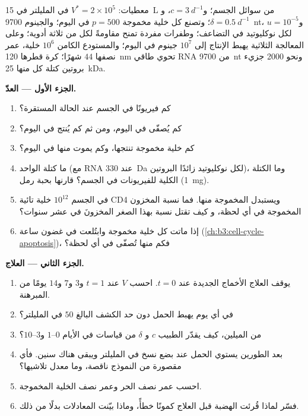 \begin{problem}
\label{pb:b3:virology:1}
معطيات:  $V^{*} = 2\times 10^{5}$ في المليلتر في \qty{15}{L} من سوائل
الجسم؛ و$c = \qty{3}{d^{-1}}$، و$\delta = \qty{0.5}{d^{-1}}$؛ وتصنع كل خلية
مخموجة $p = 500$  في اليوم؛ والجينوم \qty{9700}{nt}، و$u = 10^{-5}$
لكل نوكليوتيد في التضاعف؛ وطفرات مفردة تمنح مقاومةً
لكل من ثلاثة أدوية؛ وعلى المعالجة الثلاثية يهبط الإنتاج إلى $10^{7}$
جينوم في اليوم؛ والمستودع الكامن $10^{6}$ خلية، عمر نصفها $44$ شهرًا؛
 كرة قطرها \qty{120}{nm} تحوي طاقي RNA من \qty{9700}{nt}
ونحو \num{2000} جزيء بروتين كتلة كل منها \qty{25}{kDa}.

\medskip
\noindent\textbf{الجزء الأول --- العدّ.}
\begin{enumerate}
  \item كم فيريونًا في الجسم عند الحالة المستقرة؟
  \item كم يُصفّى في اليوم، ومن ثم كم يُنتج في اليوم؟
  \item كم خلية مخموجة تنتجها، وكم يموت منها في
        اليوم؟
  \item ما كتلة  الواحد (مع RNA عند \qty{330}{Da} لكل
        نوكليوتيد زائدًا البروتين)، وما الكتلة الكلية للفيريونات في
        الجسم؟ قارنها بحبة رمل (\qty{1}{mg}).
  \item في الجسم $10^{12}$ خلية تائية CD4 ويستبدل المخموجة
        منها. فما نسبة المخزون المخموجة في أي لحظة، و
        كيف تقتل نسبة بهذا الصغر المخزونَ في عشر سنوات؟
  \item إذا ماتت كل خلية مخموجة  وابتُلعت في غضون
        ساعة (\cref{ch:b3:cell-cycle-apoptosis})، فكم منها تُصفّى
        في أي لحظة؟
\end{enumerate}

\medskip
\noindent\textbf{الجزء الثاني --- العلاج.}
\begin{enumerate}[resume]
  \item يوقف العلاج الأخماج الجديدة عند $t = 0$. احسب $V$ عند $t =
        1$ و$3$ و$7$ و$14$ يومًا من المبرهنة.
  \item في أي يوم يهبط الحمل دون حد الكشف البالغ
        $50$ في المليلتر؟
  \item من الميلين، كيف يقدّر الطبيب $c$ و
        $\delta$ من قياسات في الأيام $0$--$1$ و$3$--$10$؟
  \item بعد الطورين يستوي الحمل عند بضع نسخ في المليلتر
        ويبقى هناك سنين. فأي مقصورة من النموذج
        ناقصة، وما معدل تلاشيها؟
  \item احسب عمر نصف  الحر وعمر نصف الخلية المخموجة.
  \item فسّر لماذا قُرئت الهضبة قبل العلاج كمونًا خطأً،
        وماذا بيّنت المعادلات بدلًا من ذلك.
\end{enumerate}


\end{problem}
